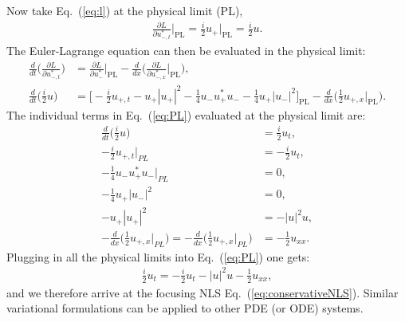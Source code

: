 Now take Eq.~(\ref{eq:l}) at the physical limit (PL),
\begin{align}
 \frac{\partial L}{\partial u_{-,t}^*} \Bigg|_{\mathrm{PL}} = \frac{i}{2} u_+ \Bigg|_{\mathrm{PL}} = \frac{i}{2} u.
\end{align}
The Euler-Lagrange equation can then be evaluated in the physical limit:
\begin{align}
\frac{d}{dt} \Big( \frac{\partial L}{\partial u_{-,t}^*} \Big) &= \frac{\partial L}{\partial u_-^*}\Bigg|_{\mathrm{PL}} - \frac{d}{dx} \Big( \frac{\partial L}{\partial u_{-,x}^*}\Bigg|_{\mathrm{PL}} \Big), \label{eq:ELPL} \\
\frac{d}{dt} \Bigg(\frac{i}{2} u\Bigg) &= \Bigg[ -\frac{i}{2}u_{+,t} - u_+|u_+|^2-\frac{1}{4}u_-u_+^*u_-  -\frac{1}{4}u_+|u_-|^2  \Bigg]_{\mathrm{PL}} - \frac{d}{dx} \Bigg( \frac{1}{2} u_{+,x} \Bigg|_{\mathrm{PL}} \Bigg). \label{eq:PL}
\end{align}
The individual terms in Eq.~(\ref{eq:PL}) evaluated at the physical limit are:
\begin{align}
 \frac{d}{dt} \Big(\frac{i}{2} u \Big) &= \frac{i}{2} u_t, \nonumber \\
 -\frac{i}{2}u_{+,t}\Big|_{PL} &= -\frac{i}{2}u_t, \nonumber \\
- \frac{1}{4}u_-u_+^*u_-\Big|_{PL}  &= 0, \nonumber \\
-\frac{1}{4}u_+|u_-|^2  & = 0, \nonumber \\
-u_+|u_+|^2 &= -|u|^2 u, \nonumber \\
 -\frac{d}{dx} \Bigg( \frac{1}{2} u_{+,x} \Bigg|_{PL} \Bigg) = -\frac{d}{dx} \Bigg( \frac{1}{2} u_{+,x} \Bigg|_{PL} \Bigg) &= - \frac{1}{2} u_{xx}. \nonumber
\end{align}
Plugging in all the physical limits into Eq.~(\ref{eq:PL}) one gets:
\begin{align}
\frac{i}{2} u_t =  -\frac{i}{2}u_t - |u|^2 u - \frac{1}{2} u_{xx}, \nonumber 
\end{align}
and we therefore arrive at the focusing NLS Eq.~(\ref{eq:conservativeNLS}).  Similar variational formulations can be applied to other PDE (or ODE) systems.  





